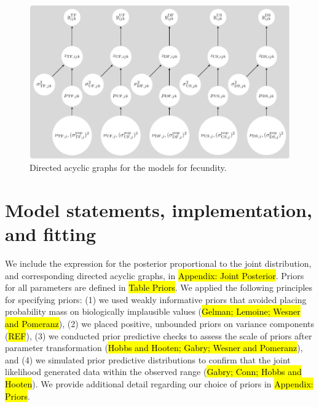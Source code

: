 \documentclass[12pt, oneside, titlepage]{article}   	%
\begin{document}
\begin{figure}[!h]
       \includegraphics[scale=1]{../../manuscript/figures/dag-fecundity.pdf}  
    \caption{ Directed acyclic graphs for the models for fecundity. }
 \label{fig:dag-fecundity}
\end{figure}



\section{Model statements, implementation, and fitting}

We include the expression for the posterior proportional to the joint distribution, and corresponding directed acyclic graphs, in \hl{Appendix: Joint Posterior}. Priors for all parameters are defined in \hl{Table Priors}. We applied the following principles for specifying priors: (1) we used weakly informative priors that avoided placing probability mass on biologically implausible values (\hl{Gelman; Lemoine; Wesner and Pomeranz}), (2) we placed positive, unbounded priors on variance components (\hl{REF}), (3) we conducted prior predictive checks to assess the scale of priors after parameter transformation (\hl{Hobbs and Hooten; Gabry; Wesner and Pomeranz}), and (4) we simulated prior predictive distributions to confirm that the joint likelihood generated data within the observed range (\hl{Gabry; Conn; Hobbs and Hooten}). We provide additional detail regarding our choice of priors in \hl{Appendix: Priors}. 
\end{document}
